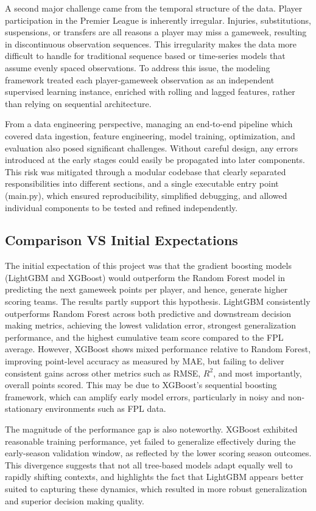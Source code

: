 \documentclass[11pt,a4paper]{article}
\begin{document}
A second major challenge came from the temporal structure of the data. Player participation in the Premier League is inherently irregular. Injuries, substitutions, suspensions, or transfers are all reasons a player may miss a gameweek, resulting in discontinuous observation sequences. This irregularity makes the data more difficult to handle for traditional sequence based or time-series models that assume evenly spaced observations. To address this issue, the modeling framework treated each player-gameweek observation as an independent supervised learning instance, enriched with rolling and lagged features, rather than relying on sequential architecture.

From a data engineering perspective, managing an end-to-end pipeline which covered data ingestion, feature engineering, model training, optimization, and evaluation also posed significant challenges. Without careful design, any errors introduced at the early stages could easily be propagated into later components. This risk was mitigated through a modular codebase that clearly separated responsibilities into different sections, and a single executable entry point (main.py), which ensured reproducibility, simplified debugging, and allowed individual components to be tested and refined independently.


\subsection{Comparison VS Initial Expectations}
The initial expectation of this project was that the gradient boosting models (LightGBM and XGBoost) would outperform the Random Forest model in predicting the next gameweek points per player, and hence, generate higher scoring teams. The results partly support this hypothesis. LightGBM consistently outperforms Random Forest across both predictive and downstream decision making metrics, achieving the lowest validation error, strongest generalization performance, and the highest cumulative team score compared to the FPL average. However, XGBoost shows mixed performance relative to Random Forest, improving point-level accuracy as measured by MAE, but failing to deliver consistent gains across other metrics such as RMSE, $R^2$, and most importantly, overall points scored. This may be due to XGBoost’s sequential boosting framework, which can amplify early model errors, particularly in noisy and non-stationary environments such as FPL data.

The magnitude of the performance gap is also noteworthy. XGBoost exhibited reasonable training performance, yet failed to generalize effectively during the early-season validation window, as reflected by the lower scoring season outcomes. This divergence suggests that not all tree-based models adapt equally well to rapidly shifting contexts, and highlights the fact that LightGBM appears better suited to capturing these dynamics, which resulted in more robust generalization and superior decision making quality. 
\end{document}
